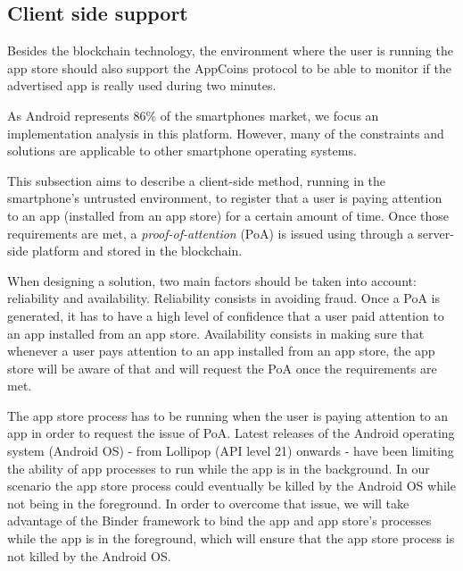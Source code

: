 \subsection{Client side support}

\label{sec:clientside}

Besides the blockchain technology, the environment where the user is running the app store should 
also support the AppCoins protocol to be able to monitor if the advertised app is really used during two minutes.


As Android represents 86\% of the smartphones market, we focus an implementation analysis in this
platform. However, many of the constraints and solutions are applicable to other smartphone operating systems.

This subsection aims to describe a client-side method, running in the smartphone's untrusted environment, to 
register that a user is paying attention to an app (installed from an app store) for a certain amount of time. Once those requirements are met, a \textit{proof-of-attention} (\textsf{PoA}) is issued using through a server-side platform and stored in the blockchain.
 
When designing a solution, two main factors should be taken into account: reliability and availability. 
Reliability consists in avoiding fraud. Once a \textsf{PoA} is generated, it has to have a high level of 
confidence that a user paid attention to an app installed from an app store. Availability consists in 
making sure that whenever a user pays attention to an app installed from an app store, the app store 
will be aware of that and will request the \textsf{PoA} once the requirements are met. %

The app store process has to be running when the user is paying attention to an app in order to request  
the issue of \textsf{PoA}. Latest releases of the Android operating system (Android OS) - from Lollipop (API 
level 21) onwards - have been limiting the ability of app processes to run while the app is in the 
background. In our scenario the app store process could eventually be killed by the Android OS while 
not being in the foreground. In order to overcome that issue, we will take advantage of the Binder 
framework to bind the app and app store's processes while the app is in the foreground, which will 
ensure that the app store process is not killed by the Android OS. 


